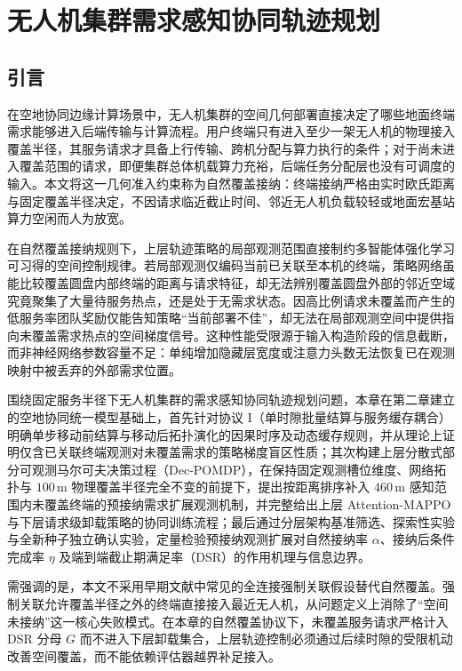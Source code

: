 \chapter{无人机集群需求感知协同轨迹规划}
\label{cha:upper-trajectory}

\section{引言}
\label{sec:ch3-intro}
\label{sec:upper-motivation}

在空地协同边缘计算场景中，无人机集群的空间几何部署直接决定了哪些地面终端需求能够进入后端传输与计算流程\cite{wu2018joint,qin2023joint,li2026sensing}。用户终端只有进入至少一架无人机的物理接入覆盖半径，其服务请求才具备上行传输、跨机分配与算力执行的条件；对于尚未进入覆盖范围的请求，即便集群总体机载算力充裕，后端任务分配层也没有可调度的输入。本文将这一几何准入约束称为自然覆盖接纳：终端接纳严格由实时欧氏距离与固定覆盖半径决定，不因请求临近截止时间、邻近无人机负载较轻或地面宏基站算力空闲而人为放宽。

在自然覆盖接纳规则下，上层轨迹策略的局部观测范围直接制约多智能体强化学习可习得的空间控制规律\cite{wang2023bandwidth,ren2022enabling,chen2024joint}。若局部观测仅编码当前已关联至本机的终端，策略网络虽能比较覆盖圆盘内部终端的距离与请求特征，却无法辨别覆盖圆盘外部的邻近空域究竟聚集了大量待服务热点，还是处于无需求状态。因高比例请求未覆盖而产生的低服务率团队奖励仅能告知策略“当前部署不佳”，却无法在局部观测空间中提供指向未覆盖需求热点的空间梯度信号。这种性能受限源于输入构造阶段的信息截断，而非神经网络参数容量不足：单纯增加隐藏层宽度或注意力头数无法恢复已在观测映射中被丢弃的外部需求位置。

围绕固定服务半径下无人机集群的需求感知协同轨迹规划问题，本章在第二章建立的空地协同统一模型基础上，首先针对协议 I（单时隙批量结算与服务缓存耦合）明确单步移动前结算与移动后拓扑演化的因果时序及动态缓存规则\cite{tao2026online}，并从理论上证明仅含已关联终端观测对未覆盖需求的策略梯度盲区性质；其次构建上层分散式部分可观测马尔可夫决策过程（Dec-POMDP），在保持固定观测槽位维度、网络拓扑与 $100\,\mathrm{m}$ 物理覆盖半径完全不变的前提下，提出按距离排序补入 $460\,\mathrm{m}$ 感知范围内未覆盖终端的预接纳需求扩展观测机制，并完整给出上层 Attention-MAPPO 与下层请求级卸载策略的协同训练流程；最后通过分层架构基准筛选、探索性实验与全新种子独立确认实验，定量检验预接纳观测扩展对自然接纳率 $\alpha$、接纳后条件完成率 $\eta$ 及端到端截止期满足率（DSR）的作用机理与信息边界。

需强调的是，本文不采用早期文献中常见的全连接强制关联假设替代自然覆盖。强制关联允许覆盖半径之外的终端直接接入最近无人机，从问题定义上消除了“空间未接纳”这一核心失败模式。在本章的自然覆盖协议下，未覆盖服务请求严格计入 DSR 分母 $G$ 而不进入下层卸载集合，上层轨迹控制必须通过后续时隙的受限机动改善空间覆盖，而不能依赖评估器越界补足接入。

